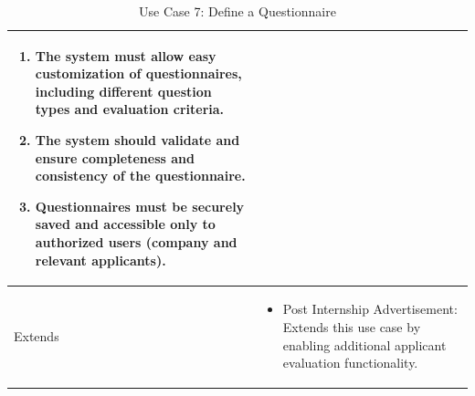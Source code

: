 \begin{table}[H]
\begin{tabular}{|l|p{12cm}|}
\begin{enumerate}
    \item The system must allow easy customization of questionnaires, including different question types and evaluation criteria.
    \item The system should validate and ensure completeness and consistency of the questionnaire.
    \item Questionnaires must be securely saved and accessible only to authorized users (company and relevant applicants).
\end{enumerate} \\ \hline
Extends          & 
\begin{itemize}
    \item Post Internship Advertisement: Extends this use case by enabling additional applicant evaluation functionality.
\end{itemize} \\ \hline
\end{tabular}
\caption{Use Case 7: Define a Questionnaire}
\label{tab:define_questionnaire}
\end{table}

